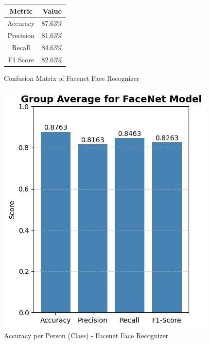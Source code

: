 \documentclass[openany]{report}
\begin{document}
\begin{figure}[H]
    \centering
    \begin{minipage}{0.48\textwidth}
        \centering
        \begin{tabular}{|c|c|}
            \hline
            \textbf{Metric} & \textbf{Value} \\ 
            \hline
            Accuracy        & 87.63\%           \\ 
            \hline
            Precision       & 81.63\%           \\ 
            \hline
            Recall          & 84.63\%           \\ 
            \hline
            F1 Score        & 82.63\%         \\ 
            \hline
        \end{tabular}
        \caption{Confusion Matrix of Facenet Face Recognizer}
        \label{tab:confusion-metrics}
    \end{minipage}
    \hfill
    \begin{minipage}{0.48\textwidth}
        \centering
        \includegraphics[width=\textwidth]{../imgs/model_2_cm (1).jpg}
        \caption{Accuracy per Person (Class) - Facenet Face Recognizer}
        \label{fig:confusion-matrix}
    \end{minipage}
\end{figure}
\end{document}
